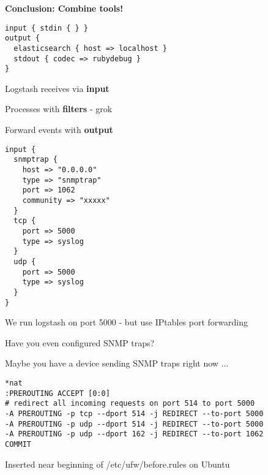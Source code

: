 \documentclass[20pt,landscape,a4paper,footrule]{foils}
\begin{document}
\vskip 2cm
\centerline{\bf\Large Conclusion: Combine tools!}



\begin{verbatim}
input { stdin { } }
output {
  elasticsearch { host => localhost }
  stdout { codec => rubydebug }
}
\end{verbatim}



\begin{list2}
\item Logstash receives via {\bf input}
\item Processes with {\bf filters} - grok
\item Forward events with {\bf output}
\end{list2}




{\footnotesize
\begin{verbatim}
input {
  snmptrap {
    host => "0.0.0.0"
    type => "snmptrap"
    port => 1062
    community => "xxxxx"
  }
  tcp {
    port => 5000
    type => syslog
  }
  udp {
    port => 5000
    type => syslog
  }
}
\end{verbatim}
}

\begin{list2}
\item We run logstash on port 5000 - but use IPtables port forwarding
\end{list2}

\centerline{Have you even configured SNMP traps?}

Maybe you have a device sending SNMP traps right now ...


{\footnotesize
\begin{verbatim}
*nat
:PREROUTING ACCEPT [0:0]
# redirect all incoming requests on port 514 to port 5000
-A PREROUTING -p tcp --dport 514 -j REDIRECT --to-port 5000
-A PREROUTING -p udp --dport 514 -j REDIRECT --to-port 5000
-A PREROUTING -p udp --dport 162 -j REDIRECT --to-port 1062
COMMIT
\end{verbatim}
}

\centerline{Inserted near beginning of /etc/ufw/before.rules on Ubuntu}
\end{document}
